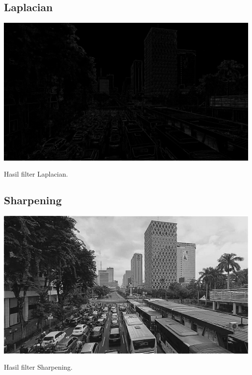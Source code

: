 \subsection{Laplacian}
\blindtext
\begin{afigure}
    \includegraphics[width=\linewidth, center]{images/output-image/input1-laplacian.png}
    \caption{Hasil filter Laplacian.}
    \label{fig:output-laplacian}
\end{afigure}

\subsection{Sharpening}
\blindtext
\begin{afigure}
    \includegraphics[width=\linewidth, center]{images/output-image/input1-sharpen.png}
    \caption{Hasil filter Sharpening.}
    \label{fig:output-sharpen}
\end{afigure}

